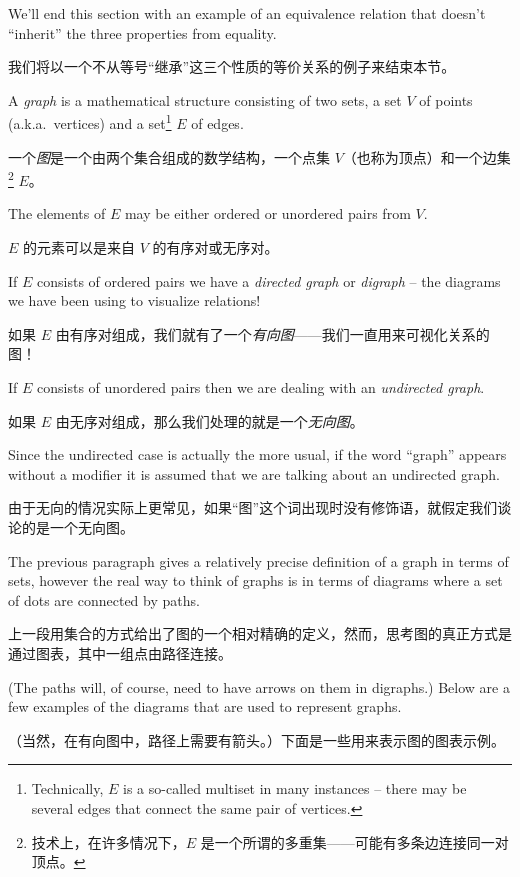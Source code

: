 We'll end this section with an example of an equivalence relation that
doesn't ``inherit'' the three properties from equality.

我们将以一个不从等号“继承”这三个性质的等价关系的例子来结束本节。

A  \emph{graph} is a mathematical structure consisting of
two sets, a set $V$ of points (a.k.a.\ vertices) and a set\footnote{Technically, $E$ is a so-called
multiset in many instances -- there may be several edges that connect the same pair of vertices.} $E$ of edges.

一个\emph{图}是一个由两个集合组成的数学结构，一个点集 $V$（也称为顶点）和一个边集\footnote{技术上，在许多情况下，$E$ 是一个所谓的多重集——可能有多条边连接同一对顶点。} $E$。

The elements of $E$ may be either ordered or unordered pairs from $V$.

$E$ 的元素可以是来自 $V$ 的有序对或无序对。

If $E$ consists of ordered pairs we have a  
\emph{directed graph} or \emph{digraph} -- the diagrams we have been using to visualize
relations!

如果 $E$ 由有序对组成，我们就有了一个\emph{有向图}——我们一直用来可视化关系的图！

If $E$ consists of unordered 
pairs then we are dealing with an \emph{undirected graph}.

如果 $E$ 由无序对组成，那么我们处理的就是一个\emph{无向图}。

Since the
undirected case is actually the more usual, if the word ``graph'' appears without
a modifier it is assumed that we are talking about an undirected graph.

由于无向的情况实际上更常见，如果“图”这个词出现时没有修饰语，就假定我们谈论的是一个无向图。

The previous paragraph gives a relatively precise definition of a graph
in terms of sets, however the real way to think of graphs is in terms
of diagrams where a set of dots are connected by paths.

上一段用集合的方式给出了图的一个相对精确的定义，然而，思考图的真正方式是通过图表，其中一组点由路径连接。

(The paths will, 
of course, need to
have arrows on them in digraphs.)  Below are a few examples of the 
diagrams that are used to represent graphs.

（当然，在有向图中，路径上需要有箭头。）下面是一些用来表示图的图表示例。

